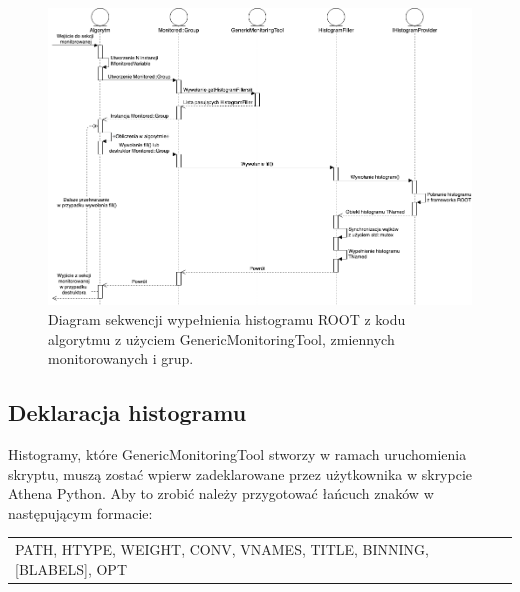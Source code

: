 \begin{figure}[!ht]
\centering
\includegraphics[width=1\textwidth]{img/classes_sequence.png}
\caption{
Diagram sekwencji wypełnienia histogramu ROOT z kodu algorytmu z użyciem GenericMonitoringTool, zmiennych monitorowanych i grup.
}
\label{fig:athena:classesSequence}
\end{figure}

\subsection{Deklaracja histogramu}
Histogramy, które GenericMonitoringTool stworzy w ramach uruchomienia skryptu, muszą zostać wpierw zadeklarowane przez użytkownika w skrypcie Athena Python. Aby to zrobić należy przygotować łańcuch znaków w następującym formacie: 

\begin{center}
\begin{tabular}{l}
PATH, HTYPE, WEIGHT, CONV, VNAMES, TITLE, BINNING, [BLABELS], OPT
\end{tabular}
\end{center}

